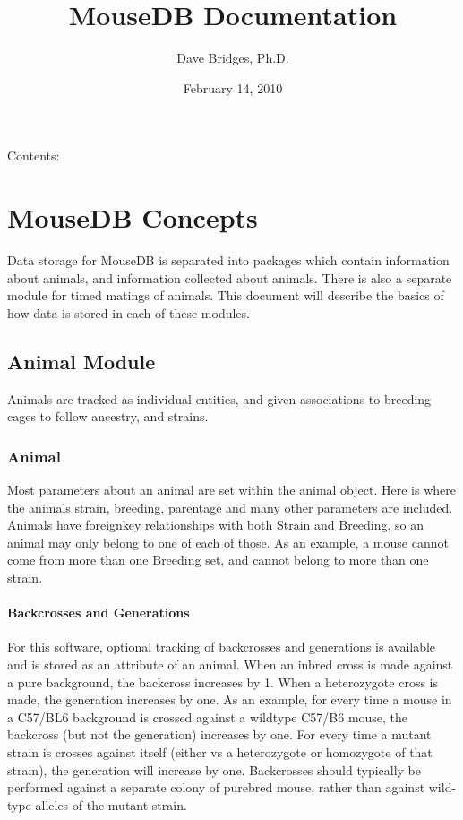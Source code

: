 \documentclass[letterpaper,10pt,english]{sphinxmanual}
\title{MouseDB Documentation}
\date{February 14, 2010}
\author{Dave Bridges, Ph.D.}
\begin{document}
\maketitle
\tableofcontents
\hypertarget{--doc-index}{}


Contents:

\resetcurrentobjects
\hypertarget{--doc-concepts}{}

\chapter{MouseDB Concepts}

Data storage for MouseDB is separated into packages which contain information about animals, and information collected about animals.  There is also a separate module for timed matings of animals.  This document will describe the basics of how data is stored in each of these modules.


\section{Animal Module}

Animals are tracked as individual entities, and given associations to breeding cages to follow ancestry, and strains.


\subsection{Animal}

Most parameters about an animal are set within the animal object.  Here is where the animals strain, breeding, parentage and many other parameters are included.  Animals have foreignkey relationships with both Strain and Breeding, so an animal may only belong to one of each of those.  As an example, a mouse cannot come from more than one Breeding set, and cannot belong to more than one strain.


\subsubsection{Backcrosses and Generations}

For this software, optional tracking of backcrosses and generations is available and is stored as an attribute of an animal.  When an inbred cross is made against a pure background, the backcross increases by 1.  When a heterozygote cross is made, the generation increases by one.  As an example, for every time a mouse in a C57/BL6 background is crossed against a wildtype C57/B6 mouse, the backcross (but not the generation) increases by one.  For every time a mutant strain is crosses against itself (either vs a heterozygote or homozygote of that strain), the generation will increase by one.  Backcrosses should typically be performed against a separate colony of purebred mouse, rather than against wild-type alleles of the mutant strain.
\end{document}

